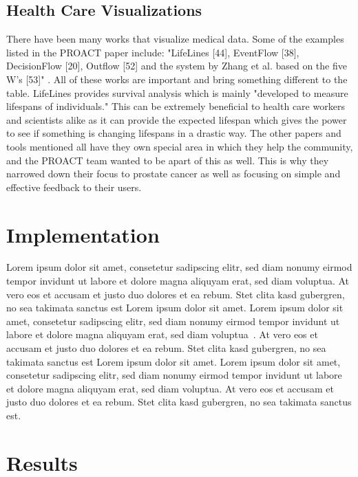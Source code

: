 \documentclass[journal]{vgtc}                %
\begin{document}
\subsection{Health Care Visualizations}
There have been many works that visualize medical data. Some of the examples listed in the PROACT paper include: "LifeLines [44], EventFlow [38], DecisionFlow [20], Outflow [52] and the
system by Zhang et al. based on the five W’s [53]" \cite[p.~2]{PROACT:2016}. All of these works are important and bring something different to the table. LifeLines provides survival analysis which is mainly "developed to measure lifespans of individuals."\cite{LifeLines:2014} This can be extremely beneficial to health care workers and scientists alike as it can provide the expected lifespan which gives the power to see if something is changing lifespans in a drastic way. The other papers and tools mentioned all have they own special area in which they help the community, and the PROACT team wanted to be apart of this as well. This is why they narrowed down their focus to prostate cancer as well as focusing on simple and effective feedback to their users.

\section{Implementation}

Lorem ipsum dolor sit amet, consetetur sadipscing elitr, sed diam
nonumy eirmod tempor invidunt ut labore et dolore magna aliquyam erat,
sed diam voluptua. At vero eos et accusam et justo duo dolores et ea
rebum. Stet clita kasd gubergren, no sea takimata sanctus est Lorem
ipsum dolor sit amet. Lorem ipsum dolor sit amet, consetetur
sadipscing elitr, sed diam nonumy eirmod tempor invidunt ut labore et
dolore magna aliquyam erat, sed diam
voluptua~\cite{Kitware:2003,Max:1995:OMF}. At vero eos et accusam et
justo duo dolores et ea rebum. Stet clita kasd gubergren, no sea
takimata sanctus est Lorem ipsum dolor sit amet. Lorem ipsum dolor sit
amet, consetetur sadipscing elitr, sed diam nonumy eirmod tempor
invidunt ut labore et dolore magna aliquyam erat, sed diam
voluptua. At vero eos et accusam et justo duo dolores et ea
rebum. Stet clita kasd gubergren, no sea takimata sanctus est.

\section{Results}
\end{document}
